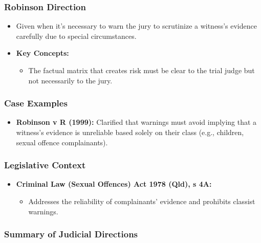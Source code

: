 \subsubsection{Robinson Direction}\label{robinson-direction}

\begin{itemize}
\tightlist
\item
  Given when it's necessary to warn the jury to scrutinize a witness's
  evidence carefully due to special circumstances.
\item
  \textbf{Key Concepts:}

  \begin{itemize}
  \tightlist
  \item
    The factual matrix that creates risk must be clear to the trial
    judge but not necessarily to the jury.
  \end{itemize}
\end{itemize}

\subsubsection{Case Examples}\label{case-examples}

\begin{itemize}
\tightlist
\item
  \textbf{Robinson v R (1999):} Clarified that warnings must avoid
  implying that a witness's evidence is unreliable based solely on their
  class (e.g., children, sexual offence complainants).
\end{itemize}

\subsubsection{Legislative Context}\label{legislative-context}

\begin{itemize}
\tightlist
\item
  \textbf{Criminal Law (Sexual Offences) Act 1978 (Qld), s 4A:}

  \begin{itemize}
  \tightlist
  \item
    Addresses the reliability of complainants' evidence and prohibits
    classist warnings.
  \end{itemize}
\end{itemize}

\subsubsection{Summary of Judicial
Directions}\label{summary-of-judicial-directions}

